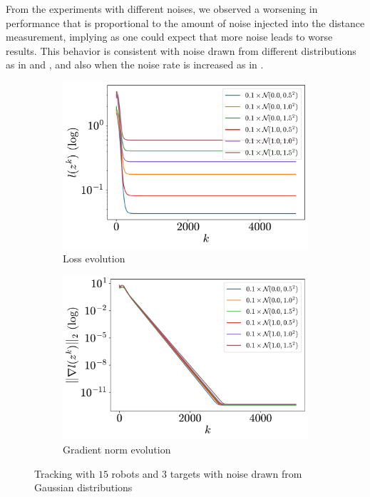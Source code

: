 \documentclass[a4paper,11pt,oneside]{book}
\begin{document}
From the experiments with different noises, we observed a worsening in performance that is proportional to the amount of noise injected into the distance measurement, implying as one could expect that more noise leads to worse results. This behavior is consistent with noise drawn from different distributions as in  and , and also when the noise rate is increased as in .

\begin{figure}[tb!]
      \centering
      \begin{subfigure}[t]{0.46\linewidth}
            \centering
            \includegraphics[width=\linewidth]{./figs/tracking/gaussian/loss.pdf} 
            \caption{Loss evolution}
      \end{subfigure}
      \hfill
      \begin{subfigure}[t]{0.46\linewidth}
            \centering
            \includegraphics[width=\linewidth]{./figs/tracking/gaussian/gradient.pdf} 
            \caption{Gradient norm evolution}
      \end{subfigure}
      \caption{Tracking with $15$ robots and $3$ targets with noise drawn from Gaussian distributions}
      \label{fig:tracking_gaussian_15_3}
\end{figure}
\end{document}
